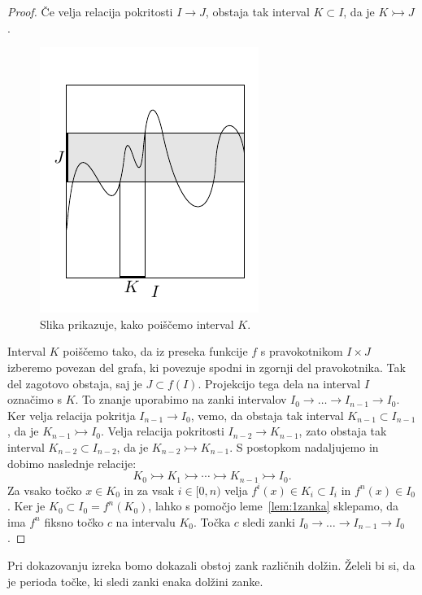 \documentclass[mat2]{fmfdelo}
\begin{document}
\begin{proof}
Če velja relacija pokritosti $I \to J$, obstaja tak interval $K \subset I$, da je $K \rightarrowtail J$.
\begin{figure}[h]
  \centering
  \includegraphics[]{images/bezje.pdf}
  \caption[Primer vektorske slike.]{Slika prikazuje, kako poiščemo interval $K$.}
  \label{fig:bezje}
\end{figure}
Interval $K$ poiščemo tako, da iz preseka funkcije $f$ s pravokotnikom $I \times J$ izberemo povezan del grafa, ki povezuje spodni in zgornji del pravokotnika. Tak del zagotovo obstaja, saj je $J \subset f(I)$. Projekcijo tega dela na interval $I$ označimo s $K$. To znanje uporabimo na zanki intervalov $I_0 \to \dots \to I_{n-1} \to I_0$. Ker velja relacija pokritja $I_{n-1} \to I_0$, vemo, da obstaja tak interval $K_{n-1} \subset I_{n-1}$, da je $K_{n-1} \rightarrowtail I_0$. Velja relacija pokritosti $I_{n-2} \to K_{n-1}$, zato obstaja tak interval $K_{n-2} \subset I_{n-2}$, da je $K_{n-2} \rightarrowtail K_{n-1}$. S postopkom nadaljujemo in dobimo naslednje relacije:
$$K_0 \rightarrowtail K_1 \rightarrowtail \cdots \rightarrowtail K_{n-1} \rightarrowtail I_0.$$
Za vsako točko $x \in K_0$ in za vsak $i \in [0, n)$ velja $f^i(x) \in K_i \subset I_i$ in $f^n(x) \in I_0$. Ker je $K_0 \subset I_0 = f^n(K_0)$, lahko s pomočjo leme~\ref{lem:1zanka} sklepamo, da ima $f^n$ fiksno točko $c$ na intervalu $K_0$. Točka $c$ sledi zanki $I_0 \to \dots \to I_{n-1} \to I_0$.
\end{proof}

Pri dokazovanju izreka bomo dokazali obstoj zank različnih dolžin. Želeli bi si, da je perioda točke, ki sledi zanki enaka dolžini zanke. 
\end{document}
